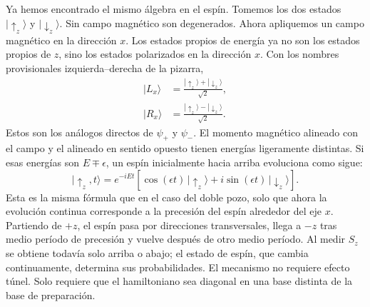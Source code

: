 Ya hemos encontrado el mismo álgebra en el espín. Tomemos los dos estados \(|\uparrow_z\rangle\) y \(|\downarrow_z\rangle\). Sin campo magnético son degenerados. Ahora apliquemos un campo magnético en la dirección \(x\). Los estados propios de energía ya no son los estados propios de \(z\), sino los estados polarizados en la dirección \(x\). Con los nombres provisionales izquierda--derecha de la pizarra,
\begin{align}
|L_x\rangle &= \frac{|\uparrow_z\rangle+|\downarrow_z\rangle}{\sqrt{2}},\\
|R_x\rangle &= \frac{|\uparrow_z\rangle-|\downarrow_z\rangle}{\sqrt{2}}.
\end{align}
Estos son los análogos directos de \(\psi_+\) y \(\psi_-\). El momento magnético alineado con el campo y el alineado en sentido opuesto tienen energías ligeramente distintas. Si esas energías son \(E\mp\epsilon\), un espín inicialmente hacia arriba evoluciona como sigue:
\begin{equation}
|\uparrow_z,t\rangle
= e^{-iEt}\left[\cos(\epsilon t)\,|\uparrow_z\rangle
+ i\sin(\epsilon t)\,|\downarrow_z\rangle\right].
\end{equation}
Esta es la misma fórmula que en el caso del doble pozo, solo que ahora la evolución continua corresponde a la precesión del espín alrededor del eje \(x\). Partiendo de \(+z\), el espín pasa por direcciones transversales, llega a \(-z\) tras medio período de precesión y vuelve después de otro medio período. Al medir \(S_z\) se obtiene todavía solo arriba o abajo; el estado de espín, que cambia continuamente, determina sus probabilidades. El mecanismo no requiere efecto túnel. Solo requiere que el hamiltoniano sea diagonal en una base distinta de la base de preparación.

\begin{classroomqa}
\end{classroomqa}

\begin{classroomqa}
\end{classroomqa}

